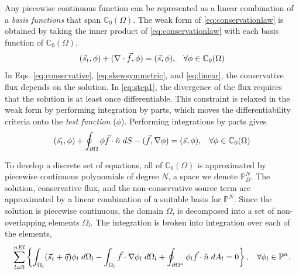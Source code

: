 \documentclass{softwaremanual}
\begin{document}
Any piecewise continuous function can be represented as a linear combination of a \textit{basis functions} that span $\mathbb{C}_0(\Omega)$. The weak form of \eqref{eq:conservationlaw} is obtained by taking the inner product of \eqref{eq:conservationlaw} with each basis function of $\mathbb{C}_0(\Omega)$,  
\begin{equation}
(\vec{s}_t,\phi) + (\nabla \cdot \vec{f}, \phi) = (\vec{s},\phi), \hspace{3mm} \forall \phi \in \mathbb{C}_0(\Omega) \label{eq:step1}
\end{equation}
In Eqs. \eqref{eq:conservative}, \eqref{eq:skewsymmetric}, and \eqref{eq:linear}, the conservative flux depends on the solution. In \eqref{eq:step1}, the divergence of the flux  requires that the solution is at least once differentiable. This constraint is relaxed in the weak form by performing integration by parts, which moves the differentiability criteria onto the \textit{test function} ($\phi$). Performing integrations by parts gives
\begin{equation}
(\vec{s}_t,\phi) + \oint_{\partial \Omega}\phi \vec{f} \cdot \hat{n} \hspace{1mm} dS - ( \vec{f},\nabla \phi) = (\vec{s},\phi), \hspace{3mm} \forall \phi \in \mathbb{C}_0(\Omega) \label{eq:weakform}
\end{equation}


 To develop a discrete set of equations, all of $\mathbb{C}_0(\Omega)$ is approximated by piecewise continuous polynomials of degree $N$, a space we denote $\mathbb{P}^N_D$. The solution, conservative flux, and the non-conservative source term are approximated by a linear combination of a suitable basis for $\mathbb{P}^N$. Since the solution is piecewise continuous, the domain $\Omega$, is decomposed into a set of non-overlapping elements $\Omega_l$. The integration is  broken into integration over each of the elements,
  \begin{equation}
 \sum_{l=0}^{nEl} \left\lbrace \int_{\Omega_l} (\vec{s}_t + \vec{q} )\phi_l \hspace{1mm} d\Omega_l  - \int_{\Omega_l} \vec{f} \cdot \nabla \phi_l \hspace{1mm} d\Omega_l + \oint_{\partial \Omega^\kappa} \phi_l \vec{f}\cdot \hat{n} \hspace{1mm} d A_l = 0 \right\rbrace, \hspace{3mm} \forall \phi_l \in \mathbb{P}^n. \label{eq:weak-decomp}
  \end{equation}
\end{document}
